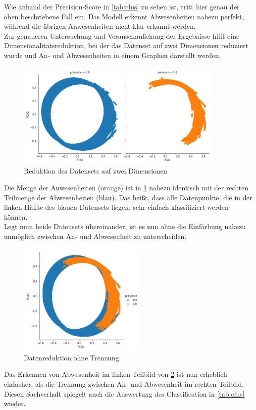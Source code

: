 Wie anhand der Precision-Score in \ref{tab:clus} zu sehen ist, tritt hier genau der oben beschriebene Fall ein.
Das Modell erkennt Abwesenheiten nahezu perfekt, während die übrigen Anwesenheiten nicht klar erkannt werden.\\
\newpage
Zur genaueren Untersuchung und Veranschaulichung der Ergebnisse hilft eine Dimensionalitätsreduktion, 
bei der das Datenset auf zwei Dimensionen reduziert wurde und An- und Abwesenheiten in einem Graphen darstellt werden.

\begin{figure}[h]
    \centering
    \includegraphics[width=0.9\textwidth]{pic/pca.png}
    \caption{Reduktion des Datensets auf zwei Dimensionen}
    \label{fig:pca}
\end{figure}

Die Menge der Anwesenheiten (orange) ist in \ref{fig:pca} nahezu identisch mit der rechten Teilmenge der 
Abwesenheiten (blau). 
Das heißt, dass alle Datenpunkte, die in der linken Hälfte des blauen Datensets liegen, sehr einfach klassifiziert 
werden können.\\
Legt man beide Datensets übereinander, ist es nun ohne die Einfärbung nahezu unmöglich zwischen An- und 
Abwesenheit zu unterscheiden.\\

\begin{figure}[h]
    \centering
    \includegraphics[width=0.55\textwidth]{pic/pca1.png}
    \caption{Datenreduktion ohne Trennung}
    \label{fig:pca1}
\end{figure}

Das Erkennen von Abwesenheit im linken Teilbild von \ref{fig:pca1} ist nun erheblich einfacher, als die Trennung 
zwischen An- und Abwesenheit im rechten Teilbild. Diesen Sachverhalt spiegelt auch die Auswertung des Classification
in \ref{tab:clus} wieder.\\
